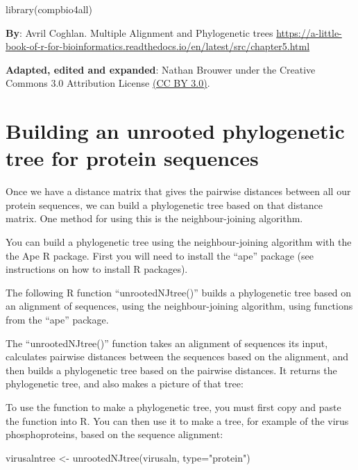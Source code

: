 \documentclass[
]{book}
\newenvironment{Shaded}{\begin{snugshade}}{\end{snugshade}}
\newcommand{\AttributeTok}[1]{\textcolor[rgb]{0.77,0.63,0.00}{#1}}
\newcommand{\FunctionTok}[1]{\textcolor[rgb]{0.00,0.00,0.00}{#1}}
\newcommand{\NormalTok}[1]{#1}
\newcommand{\OtherTok}[1]{\textcolor[rgb]{0.56,0.35,0.01}{#1}}
\newcommand{\StringTok}[1]{\textcolor[rgb]{0.31,0.60,0.02}{#1}}
\begin{document}
\begin{Shaded}
\begin{Highlighting}[]
\FunctionTok{library}\NormalTok{(compbio4all)}
\end{Highlighting}
\end{Shaded}

\textbf{By}: Avril Coghlan.
Multiple Alignment and Phylogenetic trees
\url{https://a-little-book-of-r-for-bioinformatics.readthedocs.io/en/latest/src/chapter5.html}

\textbf{Adapted, edited and expanded}: Nathan Brouwer under the Creative Commons 3.0 Attribution License \href{https://creativecommons.org/licenses/by/3.0/}{(CC BY 3.0)}.

\hypertarget{building-an-unrooted-phylogenetic-tree-for-protein-sequences}{%
\section{Building an unrooted phylogenetic tree for protein sequences}\label{building-an-unrooted-phylogenetic-tree-for-protein-sequences}}

Once we have a distance matrix that gives the pairwise distances between all our protein sequences, we can build a phylogenetic tree based on that distance matrix. One method for using this is the neighbour-joining algorithm.

You can build a phylogenetic tree using the neighbour-joining algorithm with the the Ape R package. First you will need to install the ``ape'' package (see instructions on how to install R packages).

The following R function ``unrootedNJtree()'' builds a phylogenetic tree based on an alignment of sequences, using the neighbour-joining algorithm, using functions from the ``ape'' package.

The ``unrootedNJtree()'' function takes an alignment of sequences its input, calculates pairwise distances between the sequences based on the alignment, and then builds a phylogenetic tree based on the pairwise distances. It returns the phylogenetic tree, and also makes a picture of that tree:

To use the function to make a phylogenetic tree, you must first copy and paste the function into R. You can then use it to make a tree, for example of the virus phosphoproteins, based on the sequence alignment:

\begin{Shaded}
\begin{Highlighting}[]
\NormalTok{virusalntree }\OtherTok{\textless{}{-}} \FunctionTok{unrootedNJtree}\NormalTok{(virusaln,}
                               \AttributeTok{type=}\StringTok{"protein"}\NormalTok{)}
\end{Highlighting}
\end{Shaded}
\end{document}
